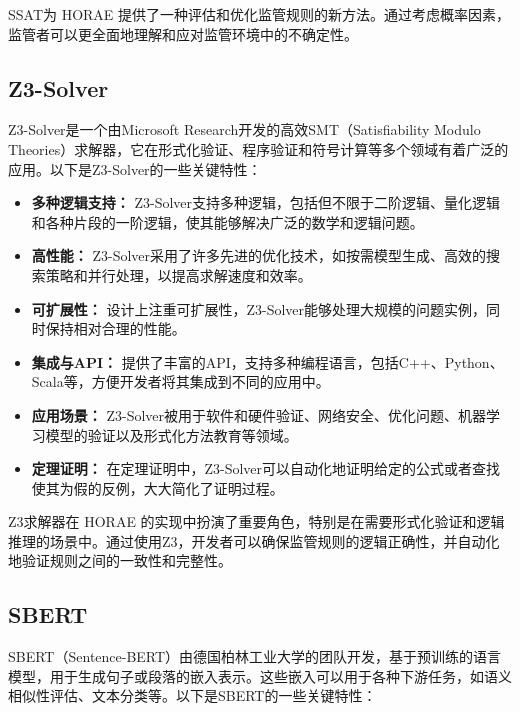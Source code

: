 SSAT为 HORAE 提供了一种评估和优化监管规则的新方法。通过考虑概率因素，监管者可以更全面地理解和应对监管环境中的不确定性。

\subsection{Z3-Solver}
Z3-Solver\cite{bjorner2023satisfiability}是一个由Microsoft Research开发的高效SMT（Satisfiability Modulo Theories）求解器，它在形式化验证、程序验证和符号计算等多个领域有着广泛的应用。以下是Z3-Solver的一些关键特性：

\begin{itemize}
    \item \textbf{多种逻辑支持：} Z3-Solver支持多种逻辑，包括但不限于二阶逻辑、量化逻辑和各种片段的一阶逻辑，使其能够解决广泛的数学和逻辑问题。
    \item \textbf{高性能：} Z3-Solver采用了许多先进的优化技术，如按需模型生成、高效的搜索策略和并行处理，以提高求解速度和效率。
    \item \textbf{可扩展性：} 设计上注重可扩展性，Z3-Solver能够处理大规模的问题实例，同时保持相对合理的性能。
    \item \textbf{集成与API：} 提供了丰富的API，支持多种编程语言，包括C++、Python、Scala等，方便开发者将其集成到不同的应用中。
    \item \textbf{应用场景：} Z3-Solver被用于软件和硬件验证、网络安全、优化问题、机器学习模型的验证以及形式化方法教育等领域。
    \item \textbf{定理证明：} 在定理证明中，Z3-Solver可以自动化地证明给定的公式或者查找使其为假的反例，大大简化了证明过程。
\end{itemize}

Z3求解器在 HORAE 的实现中扮演了重要角色，特别是在需要形式化验证和逻辑推理的场景中。通过使用Z3，开发者可以确保监管规则的逻辑正确性，并自动化地验证规则之间的一致性和完整性。

\subsection{SBERT}
SBERT\cite{wang2020sbert}（Sentence-BERT）由德国柏林工业大学的团队开发，基于预训练的语言模型，用于生成句子或段落的嵌入表示。这些嵌入可以用于各种下游任务，如语义相似性评估、文本分类等。以下是SBERT的一些关键特性：

